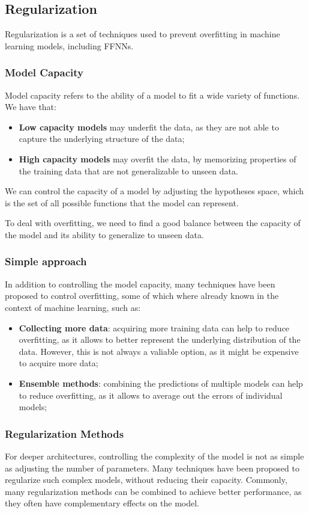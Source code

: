 \subsection{Regularization}
Regularization is a set of techniques used to prevent overfitting in machine learning models, including FFNNs.

\subsubsection{Model Capacity}
Model capacity refers to the ability of a model to fit a wide variety of functions. We have that:
\begin{itemize}
    \item \textbf{Low capacity models} may underfit the data, as they are not able to capture the underlying structure of the data;
    \item \textbf{High capacity models} may overfit the data, by memorizing properties of the training data that are not generalizable to unseen data.
\end{itemize}
We can control the capacity of a model by adjusting the hypotheses space, which is the set of all possible functions that
the model can represent.

To deal with overfitting, we need to find a good balance between the capacity of the model and its ability to generalize to unseen data.

\subsubsection{Simple approach}
In addition to controlling the model capacity, many techniques have been proposed to control overfitting, some of which where already known in the context of machine learning, such as:
\begin{itemize}
    \item \textbf{Collecting more data}: acquiring more training data can help to reduce overfitting, as it allows to better represent the underlying distribution of the data.
    However, this is not always a valiable option, as it might be expensive to acquire more data;
    \item \textbf{Ensemble methods}: combining the predictions of multiple models can help to reduce overfitting, as it allows to average out the errors of individual models;
\end{itemize}

\subsubsection{Regularization Methods}
For deeper architectures, controlling the complexity of the model is not as simple as adjusting the number of parameters.
Many techniques have been proposed to regularize such complex models, without reducing their capacity.
Commonly, many regularization methods can be combined to achieve better performance, as they often have complementary effects on the model.

